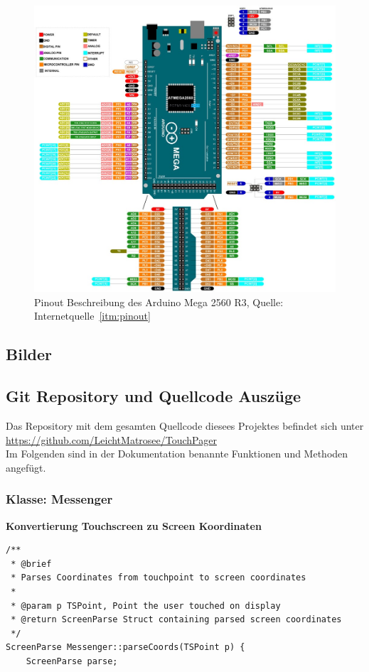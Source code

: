 \documentclass[a4paper, 11pt]{scrartcl}
\begin{document}
\begin{small}
\begin{figure}[H]
    \begin{center}
        \includegraphics[scale=2.5]{Bilder/Arduino-Mega-Pinout.jpg}
        \caption{Pinout Beschreibung des Arduino Mega 2560 R3, Quelle: Internetquelle~\ref{itm:pinout}}\label{diag:pinout}
    \end{center}
\end{figure}



\subsection{Bilder}


\newpage
\subsection{Git Repository und Quellcode Auszüge}\label{ch:codeschnipsel}
Das Repository mit dem gesamten Quellcode diesees Projektes befindet sich unter
\\
\url{https://github.com/LeichtMatrosee/TouchPager}
\\
Im Folgenden sind in der Dokumentation benannte Funktionen und Methoden angefügt.

\subsubsection{Klasse: Messenger}
\textbf{Konvertierung Touchscreen zu Screen Koordinaten}\label{code:screenparse}
\begin{lstlisting}
/**
 * @brief 
 * Parses Coordinates from touchpoint to screen coordinates
 * 
 * @param p TSPoint, Point the user touched on display
 * @return ScreenParse Struct containing parsed screen coordinates
 */
ScreenParse Messenger::parseCoords(TSPoint p) {
    ScreenParse parse;
    

\end{lstlisting}
\end{small}
\end{document}
